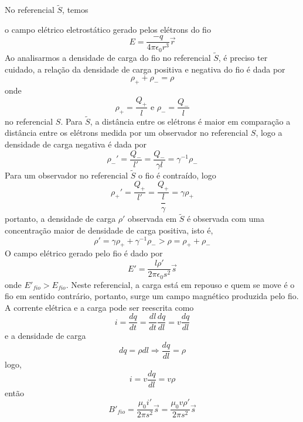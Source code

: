 \documentclass[10pt,a4paper]{article}
\begin{document}
\begin{enumerate}
\begin{enumerate}
		No referencial $\tilde{S}$, temos
		
		o campo elétrico eletrostático gerado pelos elétrons do fio
		\begin{equation*}
			E = \dfrac{-q}{4\pi \epsilon_0 r^3}\vec{r}
		\end{equation*}
		Ao analisarmos a densidade de carga do fio no referencial $\tilde{S}$, é preciso ter cuidado, a relação da densidade de carga positiva e negativa do fio é dada por
		\begin{equation*}
			\rho_+ +\rho_- = \rho
		\end{equation*}
		onde
		\begin{equation*}
			\rho_+ = \frac{Q_+}{l}\text{ e  } \rho_- = \frac{Q_-}{l}
		\end{equation*}
		no referencial $ S $.
		Para $\tilde{S}$, a distância entre os elétrons é maior em comparação a distância entre os elétrons medida por um observador no referencial $ S $, logo a densidade de carga negativa é dada por
		\begin{equation*}
			\rho_-'  = \dfrac{Q_-}{l'}=\dfrac{Q_-}{\gamma l} = \gamma^{-1} \rho_-
		\end{equation*}
		Para um observador no referencial $\tilde{S}$ o fio é contraído, logo
		\begin{equation*}
			\rho_+\prime = \dfrac{Q_+}{l\prime} = \dfrac{Q_+}{\dfrac{l}{\gamma}} = \gamma\rho_+
		\end{equation*}
		portanto, a densidade de carga $\rho\prime$ observada em $\tilde{S}$ é observada com uma concentração maior de densidade de carga positiva, isto é,
		\begin{equation*}
			\rho\prime = \gamma\rho_+ + \gamma^{-1}\rho_- > \rho = \rho_+ + \rho_-
		\end{equation*}
		O campo elétrico gerado pelo fio é dado por
		\begin{equation*}
			E' = \dfrac{l\rho\prime }{2\pi \epsilon_0s^2 }\vec{s}
		\end{equation*}
		onde $ E'_{fio} > E_{fio} $.
		Neste referencial, a carga está em repouso e quem se move é o fio em sentido contrário, portanto, surge um campo magnético produzida pelo fio. A corrente elétrica e a carga pode ser reescrita como 
		\begin{equation*}
			i = \dfrac{dq}{dt} = \dfrac{dl}{dt}\dfrac{dq}{dl} = v \dfrac{dq}{dl}
		\end{equation*}
		e a densidade de carga
		\begin{equation*}
			dq = \rho dl \Rightarrow \dfrac{dq}{dl} = \rho
		\end{equation*}
		logo,
		\begin{equation*}
			i = v\dfrac{dq}{dl} = v\rho
		\end{equation*}	
		então
		\begin{equation*}
			B'_{fio} = \dfrac{\mu_0 i\prime}{2\pi s^2}\vec{s} = \dfrac{\mu_0 v\rho\prime}{2\pi s^2}\vec{s}
		\end{equation*}
		

\end{enumerate}
\end{enumerate}
\end{document}
